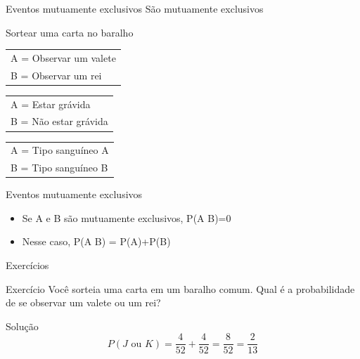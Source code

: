 \documentclass{beamer}
\begin{document}
\begin{frame}{Eventos mutuamente exclusivos}
  \alert{São} mutuamente exclusivos
  \begin{example}
    Sortear uma carta no baralho
    \begin{tabular}{l}
      A = Observar um valete\\
      B = Observar um rei\\
    \end{tabular}
  \end{example}
  \begin{example}
    \begin{tabular}{l}
      A = Estar grávida\\
      B = Não estar grávida\\
    \end{tabular}
  \end{example}
  \begin{example}
    \begin{tabular}{l}
      A = Tipo sanguíneo A\\
      B = Tipo sanguíneo B\\
    \end{tabular}
  \end{example}
\end{frame}

\begin{frame}{Eventos mutuamente exclusivos}
  \begin{itemize}
  \item Se A e B são mutuamente exclusivos, P(A  B)=0
  \item Nesse caso, P(A  B) = P(A)+P(B)
  \end{itemize}
\end{frame}

\begin{frame}{Exercícios}
  \begin{block}{Exercício}
    Você sorteia uma carta em um baralho comum. Qual é a probabilidade
    de se observar um valete ou um rei?
  \end{block}
  \begin{block}{Solução}
    \begin{displaymath}
      P(J \text{ ou } K) = \frac{4}{52} + \frac{4}{52} = \frac{8}{52} = \frac{2}{13}
    \end{displaymath}
  \end{block}
\end{frame}
\end{document}
